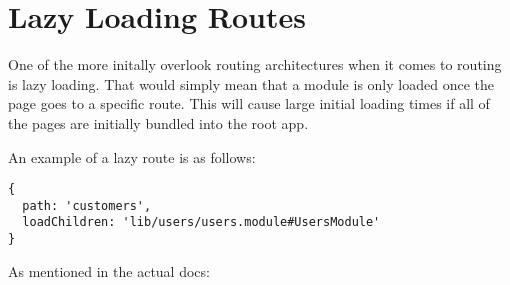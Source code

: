 \maketitle{}
\section{ Lazy Loading Routes }
One of the more initally overlook routing architectures when it comes to routing
is lazy loading. That would simply mean that a module is only loaded once
the page goes to a specific route. This will cause large initial loading times
if all of the pages are initially bundled into the root app.

An example of a lazy route is as follows:
\begin{lstlisting}
{
  path: 'customers',
  loadChildren: 'lib/users/users.module#UsersModule'
}
\end{lstlisting}

As mentioned in the actual docs:

